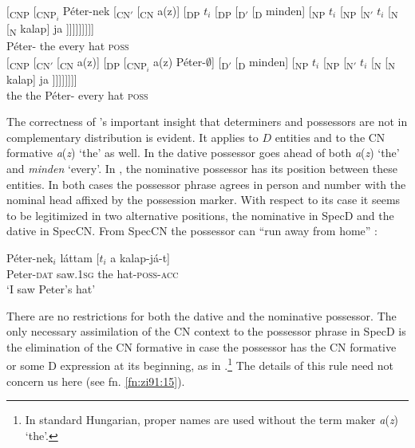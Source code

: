 \documentclass[output=paper,colorlinks,citecolor=brown]{langscibook}
\begin{document}
\ea \label{ex:zi91:17}
    \ea \label{ex:zi91:17a}
        \gll $[$\textsubscript{CNP} [\textsubscript{CNP$_i$} Péter-nek [\textsubscript{CN$'$} [\textsubscript{CN} a(z)] [\textsubscript{DP} $t_i$ [\textsubscript{DP} [\textsubscript{D$'$} [\textsubscript{D} minden] [\textsubscript{NP} $t_i$ [\textsubscript{NP} [\textsubscript{N$'$} $t_i$ [\textsubscript{N} [\textsubscript{N} kalap] ja ]]]]]]]]] \\
        {} {} Péter-\DAT {} {} {} the {} {} {} {} {} every {} {} {} {} {} {} {} hat \textsc{poss}\\
        \glt
    \ex \label{ex:zi91:17b}
        \gll $[$\textsubscript{CNP} [\textsubscript{CN$'$} [\textsubscript{CN} a(z)] [\textsubscript{DP} [\textsubscript{CNP$_i$} a(z) Péter-$\emptyset$] [\textsubscript{D$'$} [\textsubscript{D} minden] [\textsubscript{NP} $t_i$ [\textsubscript{NP} [\textsubscript{N$'$} $t_i$ [\textsubscript{N} [\textsubscript{N} kalap] ja ]]]]]]]] \\
        {} {} {} the {} {} the Péter-\NOM {} {} {} every {} {} {} {} {} {} {} hat \textsc{poss}\\
    \z
\z

\noindent The correctness of \citeauthor{Szabolosi87Functional-categories}'s important insight that determiners and possessors are not in complementary distribution is evident. It applies to $D$ entities and to the CN formative \textit{a}(\textit{z}) ‘the’ as well. In  the dative possessor goes ahead of both \textit{a}(\textit{z}) ‘the’ and \textit{minden} `every'. In , the nominative possessor has its position between these entities. In both cases the possessor phrase agrees in person and number with the nominal head affixed by the possession marker. With respect to its case it seems to be legitimized in two alternative positions, the nominative in SpecD and the dative in SpecCN. From SpecCN the possessor can “run away from home” \citet{Szabolosi83Possessor-ran-away}:

\ea \label{ex:zi91:18} 
    \gll Péter-nek$_{i}$ láttam [$t_i$ a kalap-já-t] \\
    Peter-\textsc{dat} saw.1\textsc{sg} {} the {hat-\textsc{poss}-\textsc{acc}} \\
    \glt `I saw Peter's hat'
\z

\noindent There are no restrictions for both the dative and the nominative possessor. The only necessary assimilation of the CN context to the possessor phrase in SpecD is the elimination of the CN formative in case the possessor has the CN formative or some D expression at its beginning, as in .\footnote{In standard Hungarian, proper names are used without the term maker \textit{a}(\textit{z}) ‘the’.} The details of this rule need not concern us here (see fn. \ref{fn:zi91:15}).
\end{document}
